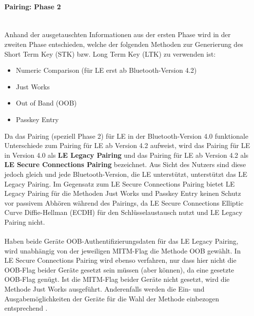 \paragraph{Pairing: Phase 2} \mbox{} \vspace{0.2cm} \\
Anhand der ausgetauschten Informationen aus der ersten Phase wird in der zweiten Phase entschieden, welche der folgenden Methoden zur Generierung des Short Term Key (STK) bzw. Long Term Key (LTK) zu verwenden ist:

\begin{itemize}
    \item{Numeric Comparison (für LE erst ab Bluetooth-Version 4.2)}
    \item{Just Works}
    \item{Out of Band (OOB)}
    \item{Passkey Entry}
\end{itemize}

Da das Pairing (speziell Phase 2) für LE in der Bluetooth-Version 4.0 funktionale Unterschiede zum Pairing für LE ab Version 4.2 aufweist, wird das Pairing für LE in Version 4.0 als \textbf{LE Legacy Pairing} und das Pairing für LE ab Version 4.2 als \textbf{LE Secure Connections Pairing} bezeichnet. Aus Sicht des Nutzers sind diese jedoch gleich und jede Bluetooth-Version, die LE unterstützt, unterstützt das LE Legacy Pairing. Im Gegensatz zum LE Secure Connections Pairing bietet LE Legacy Pairing für die Methoden Just Works und Passkey Entry keinen Schutz vor passivem Abhören während des Pairings, da LE Secure Connections Elliptic Curve Diffie-Hellman (ECDH) für den Schlüsselaustausch nutzt und LE Legacy Pairing nicht. \cite{BtSpec4.2_248}
\\\\
Haben beide Geräte OOB-Authentifizierungsdaten für das LE Legacy Pairing, wird unabhängig von der jeweiligen MITM-Flag die Methode OOB gewählt. In LE Secure Connections Pairing wird ebenso verfahren, nur dass hier nicht die OOB-Flag beider Geräte gesetzt sein müssen (aber können), da eine gesetzte OOB-Flag genügt. Ist die MITM-Flag beider Geräte nicht gesetzt, wird die Methode Just Works ausgeführt. Anderenfalls werden die Ein- und Ausgabemöglichkeiten der Geräte für die Wahl der Methode einbezogen entsprechend \cite{BtSpec4.2_tab_2302-2303}.

